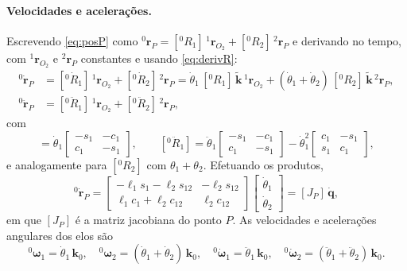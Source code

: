 \documentclass[12pt,a4paper,twoside]{article}
\newcommand{\rv}[2]{{}^{#1}\mathbf{r}_{#2}}          %
\newcommand{\rvd}[2]{{}^{#1}\dot{\mathbf{r}}_{#2}}
\newcommand{\rvdd}[2]{{}^{#1}\ddot{\mathbf{r}}_{#2}}
\newcommand{\Rmd}[2]{[{}^{#1}\dot R_{#2}]}             %
\newcommand{\Rmdd}[2]{[{}^{#1}\ddot R_{#2}]}
\newcommand{\Et}{\tilde{\mathbf k}}                   %
\newcommand{\Rm}[2]{[{}^{#1}R_{#2}]}                 %
\newcommand{\Jm}[1]{[J_{#1}]}
\numberwithin{equation}{section}
\begin{document}
\paragraph{Velocidades e acelerações.} Escrevendo \eqref{eq:posP} como
$\rv{0}{P} = \Rm{0}{1}\,\rv{1}{O_2} + \Rm{0}{2}\,\rv{2}{P}$ e derivando no tempo, com $\rv{1}{O_2}$ e $\rv{2}{P}$
constantes e usando \eqref{eq:derivR}:
\begin{align}
  \rvd{0}{P} &= \Rmd{0}{1}\,\rv{1}{O_2} + \Rmd{0}{2}\,\rv{2}{P}
             = \dot\theta_1\,\Rm{0}{1}\,\Et\,\rv{1}{O_2} + (\dot\theta_1+\dot\theta_2)\,\Rm{0}{2}\,\Et\,\rv{2}{P},\\
  \rvdd{0}{P} &= \Rmdd{0}{1}\,\rv{1}{O_2} + \Rmdd{0}{2}\,\rv{2}{P},
\end{align}
com
\begin{equation}
  \Rmd{0}{1} = \dot\theta_1\begin{bmatrix} -s_1 & -c_1 \\ c_1 & -s_1 \end{bmatrix},
  \qquad
  \Rmdd{0}{1} = \ddot\theta_1\begin{bmatrix} -s_1 & -c_1 \\ c_1 & -s_1 \end{bmatrix}
               - \dot\theta_1^2\begin{bmatrix} c_1 & -s_1 \\ s_1 & c_1 \end{bmatrix},
\end{equation}
e analogamente para $\Rm{0}{2}$ com $\theta_1+\theta_2$. Efetuando os produtos,
\begin{equation}
  \rvd{0}{P} = \begin{bmatrix} -\ell_1 s_1 - \ell_2 s_{12} & -\ell_2 s_{12}\\ \ell_1 c_1 + \ell_2 c_{12} & \ell_2 c_{12}\end{bmatrix}
               \begin{bmatrix}\dot\theta_1\\ \dot\theta_2\end{bmatrix} = \Jm{P}\,\dot{\mathbf q},
\end{equation}
em que $\Jm{P}$ é a matriz jacobiana do ponto $P$. As velocidades e acelerações angulares
dos elos são
\begin{equation}
  {}^0\boldsymbol\omega_1 = \dot\theta_1\,\mathbf k_0,\quad
  {}^0\boldsymbol\omega_2 = (\dot\theta_1+\dot\theta_2)\,\mathbf k_0,\quad
  {}^0\dot{\boldsymbol\omega}_1 = \ddot\theta_1\,\mathbf k_0,\quad
  {}^0\dot{\boldsymbol\omega}_2 = (\ddot\theta_1+\ddot\theta_2)\,\mathbf k_0 .
\end{equation}
\end{document}
